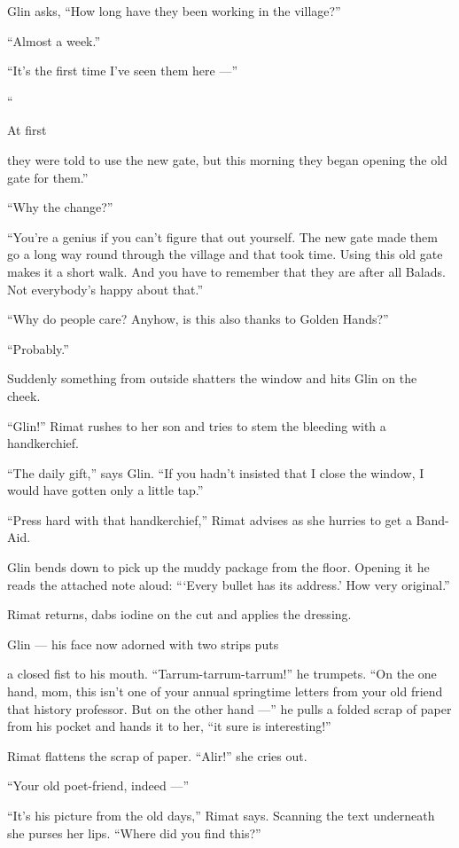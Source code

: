 \documentclass[twoside,11pt,openany]{book}
\begin{document}
{Glin asks, ``How long have they been working in the village?''

``Almost a week.''

``It's the first time I've seen them here ---''

``}At first{ they
were told to use the new gate, but this morning they began opening the old gate for them.''

``Why the change?''

``You're a genius if you can't figure that out yourself. The new gate made them go a long way
round through the village and that took time.  Using this old gate makes it a short walk. And
you have to remember that they are after all Balads. Not everybody's happy about
that.''

``Why do people care? Anyhow, is this
also {thanks
to }Golden Hands?''

``Probably.''

Suddenly something from outside shatters the window and hits Glin on
the cheek.

``Glin!'' Rimat rushes to her son and tries to stem the bleeding
with a handkerchief.

{{}``The daily gift,'' says Glin. ``If you hadn't
insisted }that {I close the window, I would have gotten only a
}little tap{.'' }

{{}``Press hard with }that
handkerchief,{{}'' Rimat advises as she hurries to get
a}{ }Band-Aid.

Glin bends down to pick up the muddy
package from the floor. Opening it he reads the attached note aloud:
``{\thinspace}`Every bullet has its address.' How very
original.''

{Rimat returns, dabs iodine on the cut and }applies the
dressing{. }

Glin --- his face now adorned with two strips
puts }a closed
fist {to his mouth. }{}``Tarrum-tarrum-tarrum!{}'' he trumpets. ``On
the one hand, mom,{ this isn't one of your annual springtime
letters from your old friend that}{ }{history
professor. But on the other hand ---'' he pulls a folded scrap of paper from his pocket and hands it
to }her,{ ``it sure is interesting!{}'' }

Rimat flattens the scrap of paper. ``Alir!'' she cries out.

{}``Your old poet-friend, indeed ---''

{}``It's his picture from the old days,{}'' Rimat says. Scanning the
text underneath she purses her lips. ``Where did you find this?{}''
\end{document}
